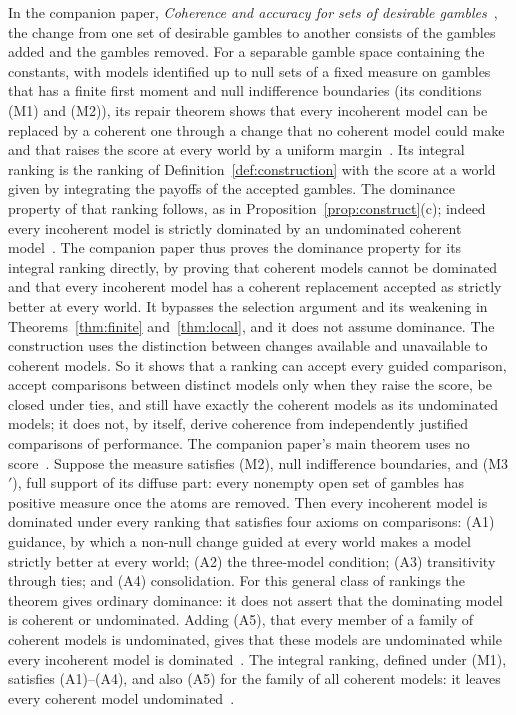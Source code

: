 \documentclass[11pt]{article}
\theoremstyle{definition}
\theoremstyle{remark}
\begin{document}
In the companion paper, \emph{Coherence and accuracy for sets of desirable gambles}~\cite{KCM}, the change from one set of desirable gambles to another consists of the gambles added and the gambles removed. For a separable gamble space containing the constants, with models identified up to null sets of a fixed measure on gambles that has a finite first moment and null indifference boundaries (its conditions (M1) and (M2)), its repair theorem shows that every incoherent model can be replaced by a coherent one through a change that no coherent model could make and that raises the score at every world by a uniform margin~\cite[Theorem~6.8]{KCM}. Its integral ranking is the ranking of Definition~\ref{def:construction} with the score at a world given by integrating the payoffs of the accepted gambles. The dominance property of that ranking follows, as in Proposition~\ref{prop:construct}(c); indeed every incoherent model is strictly dominated by an undominated coherent model~\cite[Corollary~6.9]{KCM}. The companion paper thus proves the dominance property for its integral ranking directly, by proving that coherent models cannot be dominated and that every incoherent model has a coherent replacement accepted as strictly better at every world. It bypasses the selection argument and its weakening in Theorems~\ref{thm:finite} and~\ref{thm:local}, and it does not assume dominance. The construction uses the distinction between changes available and unavailable to coherent models. So it shows that a ranking can accept every guided comparison, accept comparisons between distinct models only when they raise the score, be closed under ties, and still have exactly the coherent models as its undominated models; it does not, by itself, derive coherence from independently justified comparisons of performance. The companion paper's main theorem uses no score~\cite[Theorem~4.1]{KCM}. Suppose the measure satisfies (M2), null indifference boundaries, and (M3$'$), full support of its diffuse part: every nonempty open set of gambles has positive measure once the atoms are removed. Then every incoherent model is dominated under every ranking that satisfies four axioms on comparisons: (A1) guidance, by which a non-null change guided at every world makes a model strictly better at every world; (A2) the three-model condition; (A3) transitivity through ties; and (A4) consolidation. For this general class of rankings the theorem gives ordinary dominance: it does not assert that the dominating model is coherent or undominated. Adding (A5), that every member of a family of coherent models is undominated, gives that these models are undominated while every incoherent model is dominated~\cite[Corollary~4.10]{KCM}. The integral ranking, defined under (M1), satisfies (A1)--(A4), and also (A5) for the family of all coherent models: it leaves every coherent model undominated~\cite[Proposition~5.5]{KCM}.
\end{document}
